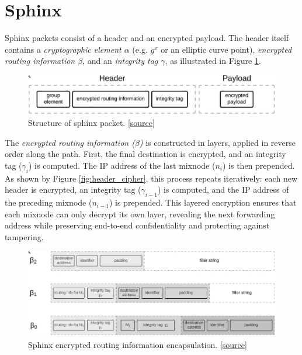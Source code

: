 \section{Sphinx}\label{sec:sphinx}

Sphinx packets consist of a header and an encrypted payload. 
The header itself contains a \textit{cryptographic element $\alpha$} (e.g. $g^x$ or an elliptic curve point), \textit{encrypted routing information $\beta$}, and an \textit{integrity tag $\gamma$}, as illustrated in Figure \ref{fig:sphinx_structure}.

\begin{figure}[h]
    \centering
    \includegraphics[width=0.9\linewidth]{Images/sphinx_structure.png}
    \caption{Structure of sphinx packet. \href{https://blog.nymtech.net/sphinx-tl-dr-the-data-packet-that-can-anonymize-bitcoin-and-the-internet-18d152c6e4dc}{[source]}}
    \label{fig:sphinx_structure}
\end{figure}

The \textit{encrypted routing information ($\beta$)} is constructed in layers, applied in reverse order along the path.
First, the final destination is encrypted, and an integrity tag ($\gamma_i$) is computed. 
The IP address of the last mixnode ($n_i$) is then prepended.
As shown by Figure \ref{fig:header_cipher}, this process repeats iteratively: each new header is encrypted, an integrity tag ($\gamma_{i-1}$) is computed, and the IP address of the preceding mixnode ($n_{i-1}$) is prepended.
This layered encryption ensures that each mixnode can only decrypt its own layer, revealing the next forwarding address while preserving end-to-end confidentiality and protecting against tampering.

\begin{figure}[h]
    \centering
    \includegraphics[width=\linewidth]{Images/sphinx_header.png}
    \caption{Sphinx encrypted routing information encapsulation. \href{https://blog.nymtech.net/sphinx-tl-dr-the-data-packet-that-can-anonymize-bitcoin-and-the-internet-18d152c6e4dc}{[source]}}
    \label{fig:sphinx_header}
\end{figure}

